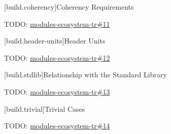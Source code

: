 [build.coherency]{Coherency Requirements}

\pnum TODO: \href{https://github.com/cplusplus/modules-ecosystem-tr/issues/11}{modules-ecosystem-tr\#11}

[build.header-units]{Header Units}

\pnum TODO: \href{https://github.com/cplusplus/modules-ecosystem-tr/issues/12}{modules-ecosystem-tr\#12}

[build.stdlib]{Relationship with the Standard Library}

\pnum TODO: \href{https://github.com/cplusplus/modules-ecosystem-tr/issues/13}{modules-ecosystem-tr\#13}

[build.trivial]{Trivial Cases}

\pnum TODO: \href{https://github.com/cplusplus/modules-ecosystem-tr/issues/14}{modules-ecosystem-tr\#14}

%
